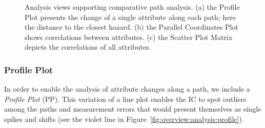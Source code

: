 \documentclass{egpubl}
\begin{document}
\begin{figure}
	\centering
	\hfill
	\hfill
	\caption{Analysis views supporting comparative path analysis. (a) the Profile Plot presents the change of a single attribute along each path; here the distance to the closest hazard. (b) the Parallel Coordinates Plot shows correlations between attributes. (c) the Scatter Plot Matrix depicts the correlations of all attributes.}
\end{figure}

\subsubsection{Profile Plot} \label{sec:overview:analysis:profile}
In order to enable the analysis of attribute changes along a path, we include a \emph{Profile Plot} (PP). This variation of a line plot enables the IC to spot outliers among the paths and measurement errors that would present themselves as single spikes and shifts (see the violet line in Figure~\ref{fig:overview:analysis:profile}).
\end{document}
